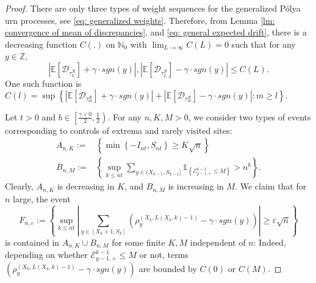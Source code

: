 \documentclass[EJP]{ejpecp} %
\newcommand{\abs}[1]{\left\vert #1 \right\vert}
\begin{document}
\begin{proof} There are only three types of weight sequences for the generalized P\'{o}lya urn processes, see \eqref{eq: generalized weights}. Therefore, from Lemma \ref{lm: convergence of mean of discrepancies}, and 
	\eqref{eq: general expected drift}, there is a decreasing function $C(.)$ on $\mathbb{N}_0$ with $\lim_{L\to \infty}C(L) =0$ such that for any $y \in \mathbb{Z}$,
	\begin{equation}\label{eq: uniform convergence}
		\abs{\mathbb{E}\left[ \mathscr{D}_{\tau_L^{\mathscr{R}}} \right] + \gamma \cdot sgn(y)}, \abs{\mathbb{E}\left[ \mathscr{D}_{\tau_L^{\mathscr{B}}} \right] - \gamma \cdot sgn(y)} \leq C(L).
	\end{equation} One such function is $C(l) = \sup \left\{  \abs{\mathbb{E}\left[ \mathscr{D}_{\tau_m^{\mathscr{R}}} \right] + \gamma \cdot sgn(y)} + \abs{\mathbb{E}\left[ \mathscr{D}_{\tau_m^{\mathscr{B}}} \right] - \gamma \cdot sgn(y)} : m\geq l \right\}.     $  
	
	
	Let $t>0$ and $b \in \left[\frac{\gamma \vee 0 }{2},\frac{1}{2}\right)$. For any $n,K,M>0$, we consider two types of events corresponding to controls of extrema and rarely visited sites:
	\begin{align*}
		A_{n,K}:=&\left\{ \min\left\{-I_{nt}, S_{nt}\right\} \geq K \sqrt{n}  \right\}
		\\
		B_{n,M}:=& \left\{  \sup_{k\leq n t} \sum_{ y\in (X_{k-1}, S_{k-1}]}  \mathbb{1}_{\left\{ \mathcal{E}^{k-1}_{y-1,+} \leq M  \right\}} >n^b  \right\}.
	\end{align*}
	Clearly, $A_{n,K}$ is decreasing in $K$, and $B_{n,M}$ is increasing in $M$. We claim that for $n$ large, the event 
	\[
	F_{n,\varepsilon}:= \left\{ \sup_{k\leq n t}  \abs{  	\sum_{y\in [X_{k}+1 ,S_k]} \left( \rho^{(X_k,L(X_k,k)-1)}_y -  \gamma \cdot sgn(y) \right) } \geq  \varepsilon \sqrt{n}    \right\}
	\] 
	is contained in $A_{n,K} \cup B_{n,M} $ for some finite $K, M$ independent of $n$:   
	Indeed, depending on whether $\mathcal{E}^{k-1}_{y-1,+} \leq M$ or not, terms  $\left( \rho^{(X_k,L(X_k,k)-1)}_y -  \gamma \cdot sgn(y) \right)$ are bounded by $C(0)$ or $C(M)$. 
	

\end{proof}
\end{document}
